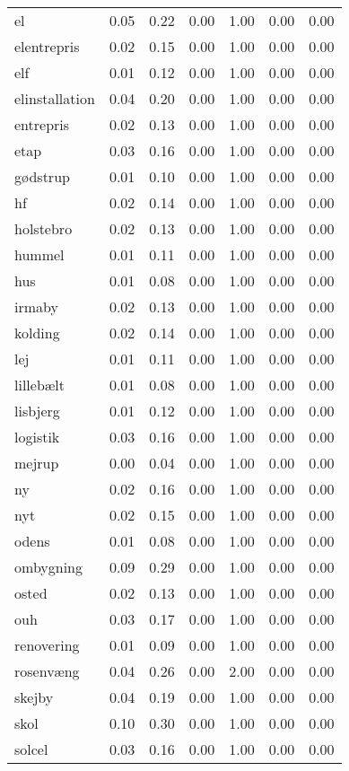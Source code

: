 \begin{landscape}
\begin{longtable}[h!]{lllllll}
el & 0.05 & 0.22 & 0.00 & 1.00 & 0.00 & 0.00 \\
elentrepris & 0.02 & 0.15 & 0.00 & 1.00 & 0.00 & 0.00 \\
elf & 0.01 & 0.12 & 0.00 & 1.00 & 0.00 & 0.00 \\
elinstallation & 0.04 & 0.20 & 0.00 & 1.00 & 0.00 & 0.00 \\
entrepris & 0.02 & 0.13 & 0.00 & 1.00 & 0.00 & 0.00 \\
etap & 0.03 & 0.16 & 0.00 & 1.00 & 0.00 & 0.00 \\
gødstrup & 0.01 & 0.10 & 0.00 & 1.00 & 0.00 & 0.00 \\
hf & 0.02 & 0.14 & 0.00 & 1.00 & 0.00 & 0.00 \\
holstebro & 0.02 & 0.13 & 0.00 & 1.00 & 0.00 & 0.00 \\
hummel & 0.01 & 0.11 & 0.00 & 1.00 & 0.00 & 0.00 \\
hus & 0.01 & 0.08 & 0.00 & 1.00 & 0.00 & 0.00 \\
irmaby & 0.02 & 0.13 & 0.00 & 1.00 & 0.00 & 0.00 \\
kolding & 0.02 & 0.14 & 0.00 & 1.00 & 0.00 & 0.00 \\
lej & 0.01 & 0.11 & 0.00 & 1.00 & 0.00 & 0.00 \\
lillebælt & 0.01 & 0.08 & 0.00 & 1.00 & 0.00 & 0.00 \\
lisbjerg & 0.01 & 0.12 & 0.00 & 1.00 & 0.00 & 0.00 \\
logistik & 0.03 & 0.16 & 0.00 & 1.00 & 0.00 & 0.00 \\
mejrup & 0.00 & 0.04 & 0.00 & 1.00 & 0.00 & 0.00 \\
ny & 0.02 & 0.16 & 0.00 & 1.00 & 0.00 & 0.00 \\
nyt & 0.02 & 0.15 & 0.00 & 1.00 & 0.00 & 0.00 \\
odens & 0.01 & 0.08 & 0.00 & 1.00 & 0.00 & 0.00 \\
ombygning & 0.09 & 0.29 & 0.00 & 1.00 & 0.00 & 0.00 \\
osted & 0.02 & 0.13 & 0.00 & 1.00 & 0.00 & 0.00 \\
ouh & 0.03 & 0.17 & 0.00 & 1.00 & 0.00 & 0.00 \\
renovering & 0.01 & 0.09 & 0.00 & 1.00 & 0.00 & 0.00 \\
rosenvæng & 0.04 & 0.26 & 0.00 & 2.00 & 0.00 & 0.00 \\
skejby & 0.04 & 0.19 & 0.00 & 1.00 & 0.00 & 0.00 \\
skol & 0.10 & 0.30 & 0.00 & 1.00 & 0.00 & 0.00 \\
solcel & 0.03 & 0.16 & 0.00 & 1.00 & 0.00 & 0.00 \\

\end{longtable}
\end{landscape}
